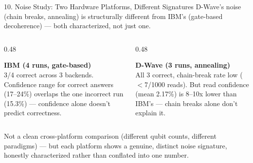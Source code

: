 \documentclass[aspectratio=169,10pt]{beamer}
\begin{document}
\begin{frame}{10. Noise Study: Two Hardware Platforms, Different Signatures}
  \small D-Wave's noise (chain breaks, annealing) is structurally different from IBM's (gate-based decoherence) --- both characterized, not just one.
  \vspace{6pt}
  \begin{columns}[T]
    \begin{column}{0.48\textwidth}
      \begin{cardbox}
      \textbf{\color{navy}\footnotesize IBM (4 runs, gate-based)}\\[4pt]
      \tiny 3/4 correct across 3 backends. Confidence range for correct answers (17--24\%) overlaps the one incorrect run (15.3\%) --- confidence alone doesn't predict correctness.
      \end{cardbox}
    \end{column}
    \begin{column}{0.48\textwidth}
      \begin{cardbox}
      \textbf{\color{navy}\footnotesize D-Wave (3 runs, annealing)}\\[4pt]
      \tiny All 3 correct, chain-break rate low ($<$7/1000 reads). But read confidence (mean 2.17\%) is 8--10x lower than IBM's --- chain breaks alone don't explain it.
      \end{cardbox}
    \end{column}
  \end{columns}
  \vspace{8pt}
  \begin{navybox}
  \footnotesize Not a clean cross-platform comparison (different qubit counts, different paradigms) --- but each platform shows a genuine, distinct noise signature, honestly characterized rather than conflated into one number.
  \end{navybox}
\end{frame}
\end{document}
